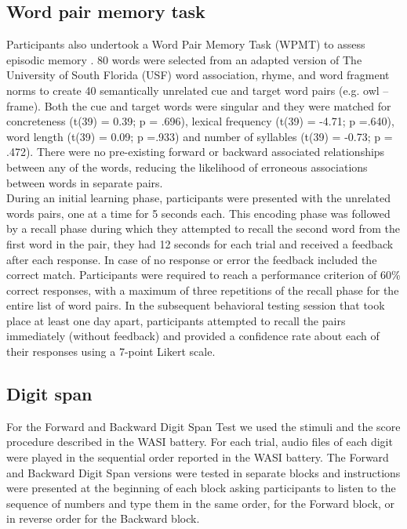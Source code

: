 \subsection{Word pair memory task}
Participants also undertook a Word Pair Memory Task (WPMT) to assess episodic memory \cite{Cairney2016}. 80 words were selected from an adapted version of The University of South Florida (USF) word association, rhyme, and word fragment norms \cite{Nelson2004} to create 40 semantically unrelated cue and target word pairs (e.g. owl – frame). Both the cue and target words were singular and they were matched for concreteness (t(39) = 0.39; p = .696), lexical frequency (t(39) = -4.71; p =.640), word length (t(39) = 0.09; p =.933) and number of syllables (t(39) = -0.73; p = .472). There were no pre-existing forward or backward associated relationships between any of the words, reducing the likelihood of erroneous associations between words in separate pairs.\\
During an initial learning phase, participants were presented with the unrelated words pairs, one at a time for 5 seconds each. This encoding phase was followed by a recall phase during which they attempted to recall the second word from the first word in the pair, they had 12 seconds for each trial and received a feedback after each response. In case of no response or error the feedback included the correct match. Participants were required to reach a performance criterion of 60\% correct responses, with a maximum of three repetitions of the recall phase for the entire list of word pairs. In the subsequent behavioral testing session that took place at least one day apart, participants attempted to recall the pairs immediately (without feedback) and provided a confidence rate about each of their responses using a 7-point Likert scale.

\subsection{Digit span}
For the Forward and Backward Digit Span Test we used the stimuli and the score procedure described in the WASI battery. For each trial, audio files of each digit were played in the sequential order reported in the WASI battery. The Forward and Backward Digit Span versions were tested in separate blocks and instructions were presented at the beginning of each block asking participants to listen to the sequence of numbers and type them in the same order, for the Forward block, or in reverse order for the Backward block.

